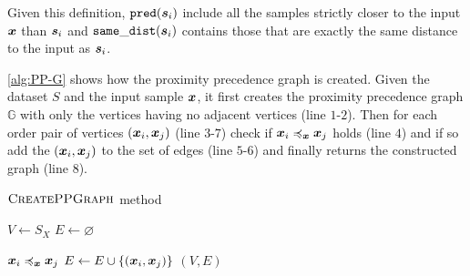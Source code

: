 \noindent Given this definition, $\pred{\sample}$ include all the samples strictly closer to the input $\vinput$ than $\sample$ and $\samedist{\sample}$ contains those that are exactly the same distance to the input as $\sample$.

\autoref{alg:PP-G} shows how the proximity precedence graph is created. Given the dataset $S$ and the input sample $\vinput$, it first creates the proximity precedence graph $\mathbb{G}$ with only the vertices having no adjacent vertices (line $1$-$2$). Then for each order pair of vertices $(\x[i], \x[j])$ (line $3$-$7$) check if $\pre{\x[i]}{\x[j]}$ holds (line $4$) and if so add the $(\x[i], \x[j])$ to the set of edges (line $5$-$6$) and finally returns the constructed graph (line $8$).

\begin{algorithm}[H]
	\caption[$\algtitle{CreatePPGraph}$ method]{$\algtitle{CreatePPGraph}$ method}
	\label{alg:PP-G}
	\begin{algorithmic}[1]

    \State $V \gets S_X$
    \State $E \gets \varnothing$

      \If $\pre{\x[i]}{\x[j]}$
        \State $E \gets E \cup \{(\x[i], \x[j])\}$
      \EndIf
    \EndFor
		\State \Return $(V, E)$
	\end{algorithmic}
\end{algorithm}

